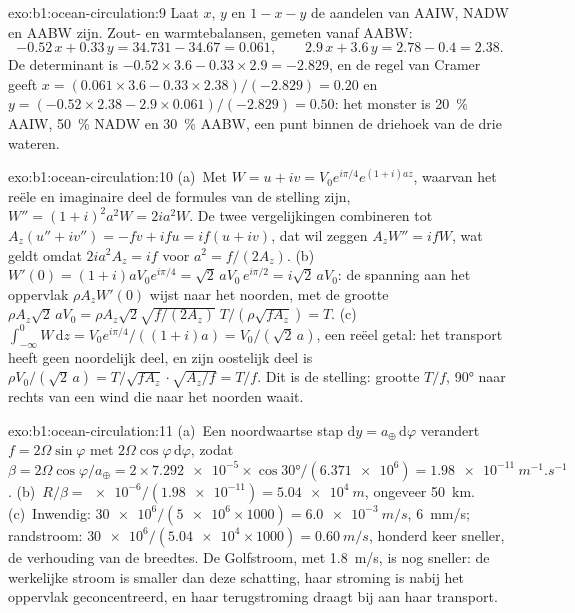 \begin{solution}{exo:b1:ocean-circulation:9}
Laat $x$, $y$ en $1 - x - y$ de aandelen van AAIW, NADW en AABW zijn. Zout- en warmtebalansen, gemeten vanaf AABW:
\[
  -0.52\,x + 0.33\,y = 34.731 - 34.67 = 0.061,\qquad
  2.9\,x + 3.6\,y = 2.78 - 0.4 = 2.38 .
\]
De determinant is $-0.52 \times 3.6 - 0.33 \times 2.9 = -2.829$, en de regel van Cramer
geeft $x = (0.061 \times 3.6 - 0.33 \times 2.38)/(-2.829) = 0.20$ en $y = (-0.52
\times 2.38 - 2.9 \times 0.061)/(-2.829) = 0.50$: het monster is \qty{20}{\percent}
AAIW, \qty{50}{\percent} NADW en \qty{30}{\percent} AABW, een punt binnen de driehoek van de drie wateren.
\end{solution}

\begin{solution}{exo:b1:ocean-circulation:10}
(a)~Met $W = u + iv = V_0e^{i\pi/4}e^{(1+i)az}$, waarvan het reële en imaginaire deel de
formules van de stelling zijn, $W'' = (1+i)^2a^2W = 2ia^2W$. De twee vergelijkingen
combineren tot $A_z(u'' + iv'') = -fv + ifu = if(u + iv)$, dat wil zeggen $A_zW'' = ifW$,
wat geldt omdat $2ia^2A_z = if$ voor $a^2 = f/(2A_z)$. (b)~$W'(0) =
(1+i)aV_0e^{i\pi/4} = \sqrt2\,aV_0\,e^{i\pi/2} = i\sqrt2\,aV_0$: de spanning aan het oppervlak
$\rho A_zW'(0)$ wijst naar het noorden, met de grootte $\rho A_z\sqrt2\,aV_0 = \rho A_z\sqrt2
\sqrt{f/(2A_z)}\;T/(\rho\sqrt{fA_z}) = T$. (c)~$\int_{-\infty}^0 W\,\mathrm dz =
V_0e^{i\pi/4}/((1+i)a) = V_0/(\sqrt2\,a)$, een reëel getal: het transport heeft geen
noordelijk deel, en zijn oostelijk deel is $\rho V_0/(\sqrt2\,a) =
T/\sqrt{fA_z}\cdot\sqrt{A_z/f} = T/f$. Dit is de stelling: grootte $T/f$, \ang{90} naar rechts van een wind die naar het noorden waait.
\end{solution}

\begin{solution}{exo:b1:ocean-circulation:11}
(a)~Een noordwaartse stap $\mathrm dy = a_\oplus\,\mathrm d\varphi$ verandert $f = 2\Omega
\sin\varphi$ met $2\Omega\cos\varphi\,\mathrm d\varphi$, zodat $\beta = 2\Omega
\cos\varphi/a_\oplus = 2 \times \num{7.292e-5} \times \cos\ang{30}/(\num{6.371e6}) =
\qty{1.98e-11}{m^{-1}.s^{-1}}$. (b)~$R/\beta = \num{e-6}/(\num{1.98e-11}) =
\qty{5.04e4}{m}$, ongeveer \qty{50}{km}. (c)~Inwendig: $\num{30e6}/(\num{5e6} \times
1000) = \qty{6.0e-3}{m/s}$, \qty{6}{mm/s}; randstroom: $\num{30e6}/(\num{5.04e4}
\times 1000) = \qty{0.60}{m/s}$, honderd keer sneller, de verhouding van de breedtes. De
Golfstroom, met \qty{1.8}{m/s}, is nog sneller: de werkelijke stroom is smaller dan
deze schatting, haar stroming is nabij het oppervlak geconcentreerd, en haar terugstroming draagt bij aan haar transport.
\end{solution}

